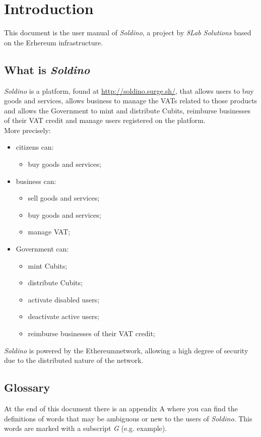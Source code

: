 \section{Introduction} 
This document is the user manual of \textit{Soldino}, a project by 
	\textit{8Lab Solutions} based on the Erhereum infrastructure. 
	\subsection{What is \textit{Soldino}}
	\textit{Soldino} is a platform, found at \url{http://soldino.surge.sh/}, 
	that allows users to buy goods and services, allows business to manage the 
	VATs related to those products and allows the Government to mint and 
	distribute Cubits\glo, reimburse businesses of their VAT credit and manage 
	users registered on the platform.\\
	More precisely:
	\begin{itemize}
		\item citizens can:
		\begin{itemize}
			\item  buy goods and services;
		\end{itemize}
		\item business can:
		\begin{itemize}
			\item sell goods and services;
			\item buy goods and services;
			\item manage VAT;
		\end{itemize}
		\item Government can:
		\begin{itemize}
			\item mint Cubits\glo;
			\item distribute Cubits\glo;
			\item activate disabled users;
			\item deactivate active users;
			\item reimburse businesses of their VAT credit;
		\end{itemize}
	\end{itemize}
	\textit{Soldino} is powered by the Ethereum\glosp network, allowing a high
	degree of security due to the distributed nature of the network.
	\subsection{Glossary}
	At the end of this document there is an appendix A where you can find 
	the definitions of words that may be ambiguous or new to the users of 
	\textit{Soldino}. This words are marked with a subscript \textit{G} 
	(e.g. example\glo).
